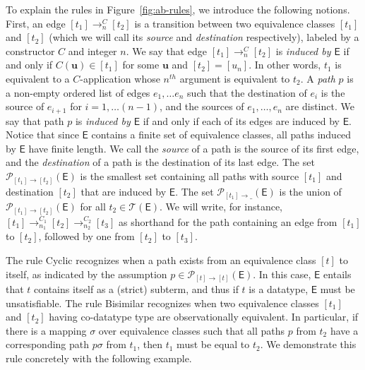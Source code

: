 \documentclass[a4paper,oribibl,envcountsame,draft]{llncs}
\renewcommand{\vec}[1]{\boldsymbol{#1}}
\newcommand{\Ec}{\mathsf{E}}
\newcommand{\tEc}{\mathcal{T}(\Ec)}
\newcommand{\rn}[1]{\textsf{\small #1}}
\newcommand{\tpath}[2]{\mathcal{P}_{ #2 \rightarrow \_ }( #1 )}
\newcommand{\ttpath}[3]{\mathcal{P}_{ #2 \rightarrow #3 }( #1 )}
\newcommand{\ec}[1]{ [ #1 ] }
\begin{document}
To explain the rules in Figure~\ref{fig:ab-rules}, we introduce the following notions.
First, an edge $\ec{t_1} \rightarrow^{C}_n \ec{t_2}$ is a transition between two equivalence classes $\ec{t_1}$ and $\ec{t_2}$ 
(which we will call its \emph{source} and \emph{destination} respectively),
labeled by a constructor $C$ and integer $n$.
We say that edge $\ec{t_1} \rightarrow^{C}_n \ec{t_2}$ is \emph{induced by $\Ec$} if and only if $C( \vec u ) \in \ec{t_1}$ for some $\vec u$ and $\ec{t_2} = \ec{u_n}$.
In other words, $t_1$ is equivalent to a $C$-application whose $n^{th}$ argument is equivalent to $t_2$.
A \emph{path} $p$ is a non-empty ordered list of edges $e_1, \ldots e_n$ such that the destination of $e_i$ is the source of $e_{i+1}$ for $i = 1, \ldots (n-1)$,
and the sources of $e_1, \ldots, e_n$ are distinct.
We say that path $p$ is \emph{induced by $\Ec$} if and only if each of its edges are induced by $\Ec$.
Notice that since $\Ec$ contains a finite set of equivalence classes, all paths induced by $\Ec$ have finite length.
We call the \emph{source} of a path is the source of its first edge, and the \emph{destination} of a path is the destination of its last edge.
The set $\ttpath{\Ec}{\ec{t_1}}{\ec{t_2}}$ is the smallest set containing all paths with source $\ec{t_1}$ and destination $\ec{t_2}$ that are induced by $\Ec$.
The set $\tpath{\Ec}{\ec{t_1}}$ is the union of $\ttpath{\Ec}{\ec{t_1}}{\ec{t_2}}$ for all $t_2 \in \tEc$.
We will write, for instance, $\ec{t_1} \rightarrow^{C_1}_{n_1} \ec{t_2} \rightarrow^{C_2}_{n_2} \ec{t_3}$ 
as shorthand for the path containing an edge from $\ec{t_1}$ to $\ec{t_2}$, followed by one from $\ec{t_2}$ to $\ec{t_3}$.

The rule \rn{Cyclic} recognizes when a path exists from an equivalence class $\ec{t}$ to itself, as indicated
by the assumption $p \in \ttpath{\Ec}{\ec{t}}{\ec{t}}$.
In this case, $\Ec$ entails that $t$ contains itself as a (strict) subterm,
and thus if $t$ is a datatype, $\Ec$ must be unsatisfiable.
The rule \rn{Bisimilar} recognizes when two equivalence classes $\ec{t_1}$ and $\ec{t_2}$ having co-datatype type are observationally equivalent.
In particular, if there is a mapping $\sigma$ over equivalence classes such that all paths $p$ from $t_2$
have a corresponding path $p \sigma$ from $t_1$,
then $t_1$ must be equal to $t_2$.
We demonstrate this rule concretely with the following example.
\end{document}
